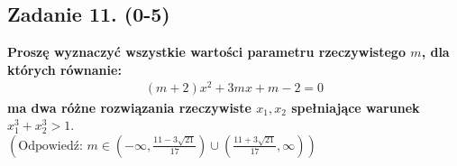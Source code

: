 \subsection*{Zadanie 11. (0-5)}
\textbf{Proszę wyznaczyć wszystkie wartości parametru rzeczywistego $m$, dla których równanie:}
\begin{align*}
        (m+2)x^{2}+3mx+m-2=0
\end{align*}
\textbf{ma dwa różne rozwiązania rzeczywiste $x_{1},x_{2}$ spełniające warunek $x_{1}^{3}+x_{2}^{3}>1$}. \\

$\left(\text{Odpowiedź: }m\in \left(-\infty,\frac{11-3\sqrt{21}}{17} \right)\cup\left(\frac{11+3\sqrt{21}}{17} ,\infty\right) \right)$